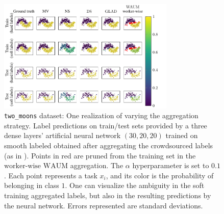 \begin{figure}[thb]
    \centering
    \includegraphics[width=0.75\textwidth]{images/PredsMoons}
    \caption{ \texttt{two\_moons} dataset: One realization of  varying the aggregation strategy. Label predictions on train/test sets provided by a three dense layers' artificial neural network $(30, 20, 20)$ trained on smooth labeled obtained after aggregating the crowdsourced labels (as in ).
        Points in red are pruned from the training set in the $\textrm{worker-wise WAUM}$ aggregation.
        The $\alpha$ hyperparameter is set to $0.1$. Each point represents a task $x_i$, and its color is the probability of belonging in class $1$.
        One can visualize the ambiguity in the soft training aggregated labels, but also in the resulting predictions by the neural network. Errors represented are standard deviations.}
    \label{fig:twomoons_predictions_soft}
\end{figure}


